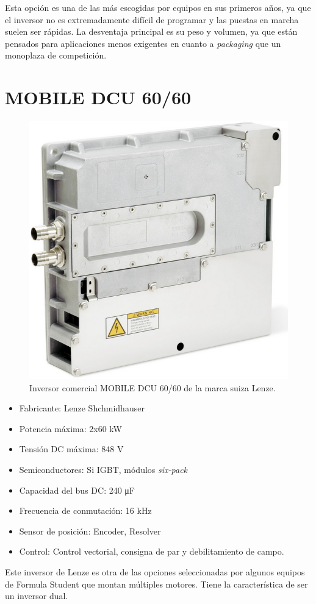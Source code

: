 Esta opción es una de las más escogidas por equipos en sus primeros años, ya que el inversor no es extremadamente difícil de programar y las puestas en marcha suelen ser rápidas. La desventaja principal es su peso y volumen, ya que están pensados para aplicaciones menos exigentes en cuanto a \textit{packaging} que un monoplaza de competición.

\section{MOBILE DCU 60/60}
\begin{figure}[H]
	\centering
	\includegraphics[width=0.5\linewidth]{fig/lenze}
	\caption{Inversor comercial MOBILE DCU 60/60 de la marca suiza Lenze. \cite{bucherdrives_mobile_dcu}}
	\label{fig:lenze}
\end{figure}

\begin{itemize}
\item Fabricante: Lenze Shchmidhauser
\item Potencia máxima: 2x60 kW
\item Tensión DC máxima: 848 V
\item Semiconductores: Si IGBT, módulos \textit{six-pack}
\item Capacidad del bus DC: 240 \unit{\micro\farad}
\item Frecuencia de conmutación: 16 kHz
\item Sensor de posición: Encoder, Resolver
\item Control: Control vectorial, consigna de par y debilitamiento de campo.
\end{itemize}

Este inversor de Lenze es otra de las opciones seleccionadas por algunos equipos de Formula Student que montan múltiples motores. Tiene la característica de ser un inversor dual. 

